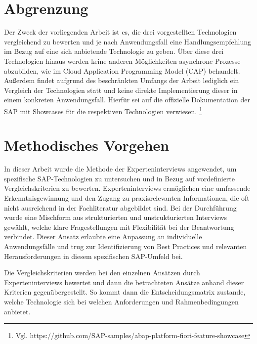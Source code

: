 \section{Abgrenzung}

Der Zweck der vorliegenden Arbeit ist es, die drei vorgestellten Technologien vergleichend zu bewerten und je nach Anwendungsfall eine Handlungsempfehlung im Bezug auf eine sich anbietende Technologie zu geben. Über diese drei Technologien hinaus werden keine anderen Möglichkeiten asynchrone Prozesse abzubilden, wie \zB im Cloud Application Programming Model (CAP) behandelt. Au{\ss}erdem findet aufgrund des beschränkten Umfangs der Arbeit lediglich ein Vergleich der Technologien statt und keine direkte Implementierung dieser in einem konkreten Anwendungsfall. Hierfür sei auf die offizielle Dokumentation der SAP mit Showcases für die respektiven Technologien verwiesen. \footnote{Vgl. https://github.com/SAP-samples/abap-platform-fiori-feature-showcase}

\section{Methodisches Vorgehen}

In dieser Arbeit wurde die Methode der Experteninterviews angewendet, um spezifische SAP-Technologien zu untersuchen und in Bezug auf vordefinierte Vergleichskriterien zu bewerten. Experteninterviews ermöglichen eine umfassende Erkenntnisgewinnung und den Zugang zu praxisrelevanten Informationen, die oft nicht ausreichend in der Fachliteratur abgebildet sind. Bei der Durchführung wurde eine Mischform aus strukturierten und unstrukturierten Interviews gewählt, welche klare Fragestellungen mit Flexibilität bei der Beantwortung verbindet. Dieser Ansatz erlaubte eine Anpassung an individuelle Anwendungsfälle und trug zur Identifizierung von Best Practices und relevanten Herausforderungen in diesem spezifischen SAP-Umfeld bei.

Die Vergleichskriterien werden bei den einzelnen Ansätzen durch Experteninterviews bewertet und dann die betrachteten Ansätze anhand dieser Kriterien gegenübergestellt. So kommt dann die Entscheidungsmatrix zustande, welche Technologie sich bei welchen Anforderungen und Rahmenbedingungen anbietet.